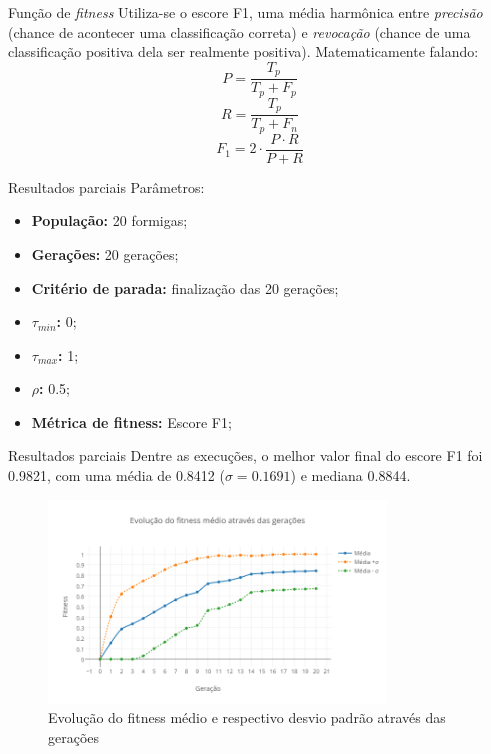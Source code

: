 \documentclass{beamer}
\begin{document}
  \begin{frame}{Função de \textit{fitness}}
      Utiliza-se o escore F1, uma média harmônica entre \textit{precisão}
      (chance de acontecer uma classificação correta) e \textit{revocação}
      (chance de uma classificação positiva dela ser realmente positiva).
      Matematicamente falando:
      \begin{equation}
          P = \dfrac{T_p}{T_p+F_p}
      \end{equation}
      \begin{equation}
          R = \dfrac{T_p}{T_p+F_n}
      \end{equation}
      \begin{equation}
          \label{eq:f1-score}
          F_1 = 2\cdot \dfrac{P\cdot R}{P+R}
      \end{equation}
  \end{frame}

  \begin{frame}{Resultados parciais}
      Parâmetros:
        \begin{itemize}
            \item \textbf{População:} 20 formigas;
            \item \textbf{Gerações:} 20 gerações;
            \item \textbf{Critério de parada:} finalização das 20 gerações;
            \item \textbf{$\tau_{min}$:} 0;
            \item \textbf{$\tau_{max}$:} 1;
            \item \textbf{$\rho$:} 0.5;
            \item \textbf{Métrica de fitness:} Escore F1;
        \end{itemize}
  \end{frame}

  \begin{frame}{Resultados parciais}
    Dentre as execuções, o melhor valor final do escore F1 foi 0.9821, com uma média de 0.8412 ($\sigma=0.1691$) e mediana 0.8844.
    \begin{figure}[H]
        \centering
        \includegraphics[width=0.8\textwidth]{grafico.png}
        \caption{Evolução do fitness médio e respectivo desvio padrão através das gerações}
        \label{fig:grafico}
    \end{figure}
  \end{frame}
\end{document}
